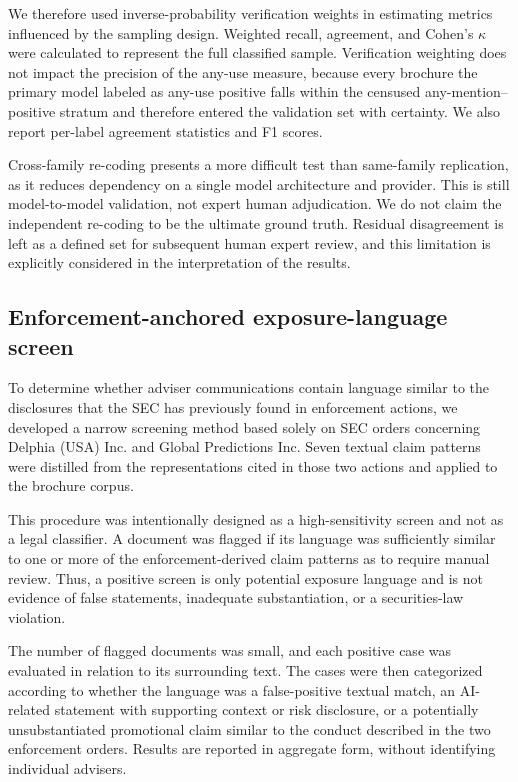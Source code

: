 \documentclass[utf8]{FrontiersinHarvard}
\begin{document}
We therefore used inverse-probability verification weights in estimating metrics influenced by the sampling design. Weighted recall, agreement, and Cohen's $\kappa$ \citep{cohen1960} were calculated to represent the full classified sample. Verification weighting does not impact the precision of the any-use measure, because every brochure the primary model labeled as any-use positive falls within the censused any-mention--positive stratum and therefore entered the validation set with certainty. We also report per-label agreement statistics and F1 scores.

Cross-family re-coding presents a more difficult test than same-family replication, as it reduces dependency on a single model architecture and provider. This is still model-to-model validation, not expert human adjudication. We do not claim the independent re-coding to be the ultimate ground truth. Residual disagreement is left as a defined set for subsequent human expert review, and this limitation is explicitly considered in the interpretation of the results.

\subsection{Enforcement-anchored exposure-language screen}

To determine whether adviser communications contain language similar to the disclosures that the SEC has previously found in enforcement actions, we developed a narrow screening method based solely on SEC orders concerning Delphia (USA) Inc. and Global Predictions Inc. Seven textual claim patterns were distilled from the representations cited in those two actions and applied to the brochure corpus.

This procedure was intentionally designed as a high-sensitivity screen and not as a legal classifier. A document was flagged if its language was sufficiently similar to one or more of the enforcement-derived claim patterns as to require manual review. Thus, a positive screen is only potential exposure language and is not evidence of false statements, inadequate substantiation, or a securities-law violation.

The number of flagged documents was small, and each positive case was evaluated in relation to its surrounding text. The cases were then categorized according to whether the language was a false-positive textual match, an AI-related statement with supporting context or risk disclosure, or a potentially unsubstantiated promotional claim similar to the conduct described in the two enforcement orders. Results are reported in aggregate form, without identifying individual advisers.
\end{document}
